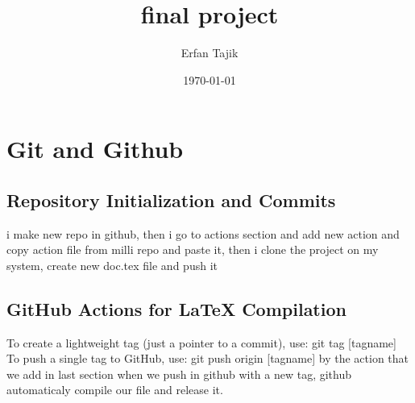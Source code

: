 \documentclass [ titlepage ]{article}
\title{final project}
\author{Erfan Tajik}
\date{\today}
\begin{document}
\maketitle

\tableofcontents
\newpage

\section{Git and Github}
\subsection{ Repository Initialization and Commits}
i make new repo in github, then i go to actions section and add new action and copy action file from milli repo and paste it,
then i clone the project on my system, create new doc.tex file and push it

\subsection{GitHub Actions for LaTeX Compilation}
To create a lightweight tag (just a pointer to a commit), use: \newline
\textdollar git tag [tagname] \newline 
To push a single tag to GitHub, use: \newline
\textdollar git push origin [tagname] \newline
by the action that we add in last section when we push in github with a new tag, github automaticaly compile our file and release it.
\end{document}
